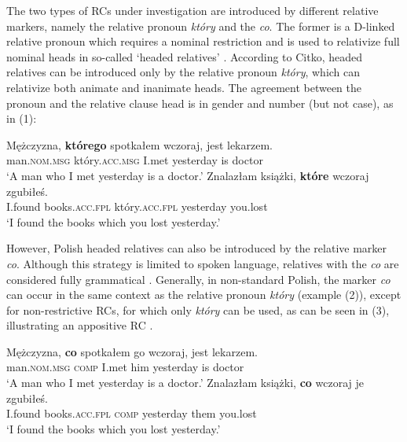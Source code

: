 \documentclass[output=paper]{langsci/langscibook}
\begin{document}
The two types of RCs under investigation are introduced by different relative markers, namely the relative pronoun \textit{który} and the  \textit{co}. The former is a D-linked relative pronoun which requires a nominal restriction and is used to relativize full nominal heads in so-called ‘headed relatives’ \citep{Citko2004}. According to Citko, headed relatives can be introduced only by the relative pronoun \textit{który}, which can relativize both animate and inanimate heads. The agreement between the pronoun and the relative clause head is in gender and number (but not case), as in (1): 

\ea%
    \label{ex:leska:1}
    \ea
    \gll Mężczyzna, \textbf{którego} spotkałem wczoraj, jest lekarzem.\\
         man.\textsc{nom.msg} który.\textsc{acc.msg} I.met yesterday is doctor\\
    \glt ‘A man who I met yesterday is a doctor.’
\ex
    \gll Znalazłam   książki, \textbf{które}   wczoraj zgubiłeś. \\
         I.found books.\textsc{acc.fpl} który.\textsc{acc.fpl} yesterday you.lost\\
    \glt ‘I found the books which you lost yesterday.’
    \z
\z    

However, Polish headed relatives can also be introduced by the  relative marker \textit{co}. Although this  strategy is limited to spoken language, relatives with the  \textit{co} are considered fully grammatical \citep{Buttler1971}. Generally, in non-standard Polish, the marker \textit{co} can occur in the same context as the relative pronoun \textit{który} (example (2)), except for non-restrictive RCs, for which only \textit{który} can be used, as can be seen in (3), illustrating an appositive RC \citep{Borsley1981,Borsley1984}.

\ea%
    \label{ex:leska:2}
    \ea
    \gll Mężczyzna, \textbf{co} spotkałem go wczoraj, jest lekarzem.\\
         man.\textsc{nom.msg} \textsc{comp} I.met him yesterday is doctor\\
    \glt ‘A man who I met yesterday is a doctor.’
    \ex
    \gll Znalazłam   książki, \textbf{co} wczoraj   je zgubiłeś. \\
         I.found books.\textsc{acc.fpl} \textsc{comp}\textsubscript{} yesterday them you.lost\\
    \glt ‘I found the books which you lost yesterday.’
    \z
\z    
\end{document}

